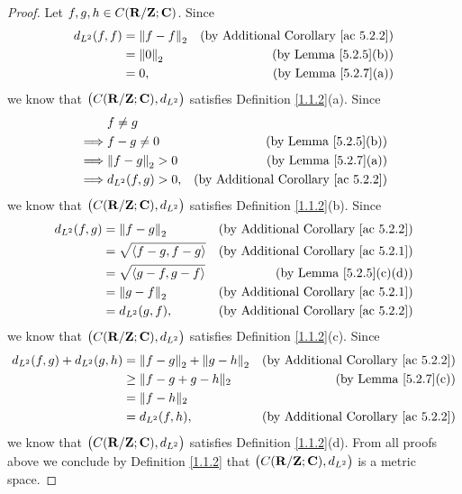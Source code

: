 \begin{proof}
    Let \(f, g, h \in C(\R / \Z ; \C)\).
    Since
    \begin{align*}
        d_{L^2}(f, f) & = \norm*{f - f}_2 & \text{(by Additional Corollary \ref{ac 5.2.2})} \\
                      & = \norm*{0}_2     & \text{(by Lemma \ref{5.2.5}(b))}                \\
                      & = 0,              & \text{(by Lemma \ref{5.2.7}(a))}
    \end{align*}
    we know that \(\big(C(\R / \Z ; \C), d_{L^2}\big)\) satisfies Definition \ref{1.1.2}(a).
    Since
    \begin{align*}
                 & f \neq g                                                              \\
        \implies & f - g \neq 0        & \text{(by Lemma \ref{5.2.5}(b))}                \\
        \implies & \norm*{f - g}_2 > 0 & \text{(by Lemma \ref{5.2.7}(a))}                \\
        \implies & d_{L^2}(f, g) > 0,  & \text{(by Additional Corollary \ref{ac 5.2.2})}
    \end{align*}
    we know that \(\big(C(\R / \Z ; \C), d_{L^2}\big)\) satisfies Definition \ref{1.1.2}(b).
    Since
    \begin{align*}
        d_{L^2}(f, g) & = \norm*{f - g}_2              & \text{(by Additional Corollary \ref{ac 5.2.2})} \\
                      & = \sqrt{\inner*{f - g, f - g}} & \text{(by Additional Corollary \ref{ac 5.2.1})} \\
                      & = \sqrt{\inner*{g - f, g - f}} & \text{(by Lemma \ref{5.2.5}(c)(d))}             \\
                      & = \norm*{g - f}_2              & \text{(by Additional Corollary \ref{ac 5.2.1})} \\
                      & = d_{L^2}(g, f),               & \text{(by Additional Corollary \ref{ac 5.2.2})}
    \end{align*}
    we know that \(\big(C(\R / \Z ; \C), d_{L^2}\big)\) satisfies Definition \ref{1.1.2}(c).
    Since
    \begin{align*}
        d_{L^2}(f, g) + d_{L^2}(g, h) & = \norm*{f - g}_2 + \norm*{g - h}_2 & \text{(by Additional Corollary \ref{ac 5.2.2})} \\
                                      & \geq \norm{f - g + g - h}_2         & \text{(by Lemma \ref{5.2.7}(c))}                \\
                                      & = \norm{f - h}_2                                                                      \\
                                      & = d_{L^2}(f, h),                    & \text{(by Additional Corollary \ref{ac 5.2.2})}
    \end{align*}
    we know that \(\big(C(\R / \Z ; \C), d_{L^2}\big)\) satisfies Definition \ref{1.1.2}(d).
    From all proofs above we conclude by Definition \ref{1.1.2} that \(\big(C(\R / \Z ; \C), d_{L^2}\big)\) is a metric space.
\end{proof}


